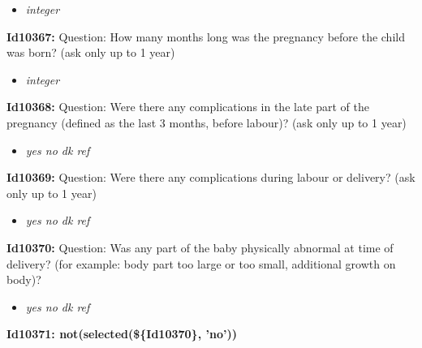 \documentclass{article}%
\begin{document}
%
\begin{itemize}%
\item%
\textit{integer\newline%
}%
\end{itemize}%
\textbf{Id10367: \newline%
}%
Question: How many months long was the pregnancy before the child was born? (ask only up to 1 year)\newline%
%
\begin{itemize}%
\item%
\textit{integer\newline%
}%
\end{itemize}%
\textbf{Id10368: \newline%
}%
Question: Were there any complications in the late part of the pregnancy (defined as the last 3 months, before labour)? (ask only up to 1 year)\newline%
%
\begin{itemize}%
\item%
\textit{yes\newline%
 no\newline%
 dk\newline%
 ref\newline%
}%
\end{itemize}%
\textbf{Id10369: \newline%
}%
Question: Were there any complications during labour or delivery? (ask only up to 1 year)\newline%
%
\begin{itemize}%
\item%
\textit{yes\newline%
 no\newline%
 dk\newline%
 ref\newline%
}%
\end{itemize}%
\textbf{Id10370: \newline%
}%
Question: Was any part of the baby physically abnormal at time of delivery? (for example: body part too large or too small, additional growth on body)?\newline%
%
\begin{itemize}%
\item%
\textit{yes\newline%
 no\newline%
 dk\newline%
 ref\newline%
}%
\end{itemize}%
\textbf{Id10371: not(selected(\$\{Id10370\}, 'no'))\newline%
}%
\end{document}
